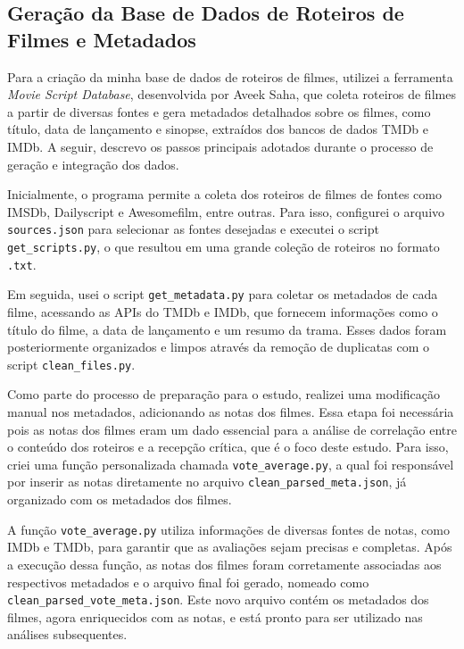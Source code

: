 \documentclass[conference]{IEEEtran}
\begin{document}
\subsection{Geração da Base de Dados de Roteiros de Filmes e Metadados}

Para a criação da minha base de dados de roteiros de filmes, utilizei a ferramenta \textit{Movie Script Database}, desenvolvida por Aveek Saha, que coleta roteiros de filmes a partir de diversas fontes e gera metadados detalhados sobre os filmes, como título, data de lançamento e sinopse, extraídos dos bancos de dados TMDb e IMDb. A seguir, descrevo os passos principais adotados durante o processo de geração e integração dos dados.

Inicialmente, o programa permite a coleta dos roteiros de filmes de fontes como IMSDb, Dailyscript e Awesomefilm, entre outras. Para isso, configurei o arquivo \texttt{sources.json} para selecionar as fontes desejadas e executei o script \texttt{get\_scripts.py}, o que resultou em uma grande coleção de roteiros no formato \texttt{.txt}.

Em seguida, usei o script \texttt{get\_metadata.py} para coletar os metadados de cada filme, acessando as APIs do TMDb e IMDb, que fornecem informações como o título do filme, a data de lançamento e um resumo da trama. Esses dados foram posteriormente organizados e limpos através da remoção de duplicatas com o script \texttt{clean\_files.py}.

Como parte do processo de preparação para o estudo, realizei uma modificação manual nos metadados, adicionando as notas dos filmes. Essa etapa foi necessária pois as notas dos filmes eram um dado essencial para a análise de correlação entre o conteúdo dos roteiros e a recepção crítica, que é o foco deste estudo. Para isso, criei uma função personalizada chamada \texttt{vote\_average.py}, a qual foi responsável por inserir as notas diretamente no arquivo \texttt{clean\_parsed\_meta.json}, já organizado com os metadados dos filmes.

A função \texttt{vote\_average.py} utiliza informações de diversas fontes de notas, como IMDb e TMDb, para garantir que as avaliações sejam precisas e completas. Após a execução dessa função, as notas dos filmes foram corretamente associadas aos respectivos metadados e o arquivo final foi gerado, nomeado como \texttt{clean\_parsed\_vote\_meta.json}. Este novo arquivo contém os metadados dos filmes, agora enriquecidos com as notas, e está pronto para ser utilizado nas análises subsequentes.
\end{document}
